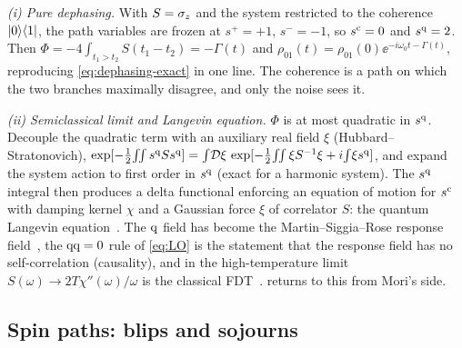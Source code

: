 \begin{exbox}
\emph{(i) Pure dephasing.}
With $S=\sigma_z$ and the system restricted to the coherence $|0\rangle\langle1|$, the path variables are frozen at $s^+=+1$, $s^-=-1$, so $s^{\mathrm{c}}=0$ and $s^{\mathrm{q}}=2$.
Then $\Phi=-4\int_{t_1>t_2}S(t_1-t_2)=-\Gamma(t)$ and $\rho_{01}(t)=\rho_{01}(0)\ee^{-i\omega_0t-\Gamma(t)}$, reproducing \cref{eq:dephasing-exact} in one line.
The coherence is a path on which the two branches maximally disagree, and only the noise sees it.

\emph{(ii) Semiclassical limit and Langevin equation.}
$\Phi$ is at most quadratic in $s^{\mathrm{q}}$.
Decouple the quadratic term with an auxiliary real field $\xi$ (Hubbard--Stratonovich), $\exp[-\tfrac12\!\int\!\!\int s^\qu Ss^\qu]=\int\!\mathcal D\xi\, \exp[-\tfrac12\!\int\!\!\int\xi S^{-1}\xi+i\!\int\!\xi s^\qu]$, and expand the system action to first order in $s^{\mathrm{q}}$ (exact for a harmonic system).
The $s^{\mathrm{q}}$ integral then produces a delta functional enforcing an equation of motion for $s^{\mathrm{c}}$ with damping kernel $\chi$ and a Gaussian force $\xi$ of correlator $S$: the quantum Langevin equation~\cite{FordKacMazur1965,CaldeiraLeggett1983}.
The $\mathrm{q}$ field has become the Martin--Siggia--Rose response field~\cite{MartinSiggiaRose1973}, the $\mathrm{q}\mathrm{q}=0$ rule of \cref{eq:LO} is the statement that the response field has no self-correlation (causality), and in the high-temperature limit $S(\omega)\to2T\chi''(\omega)/\omega$ is the classical FDT~\cite[Ch.~4]{Kamenev2011}.
 returns to this from Mori's side.
\end{exbox}

\subsection{Spin paths: blips and sojourns}

